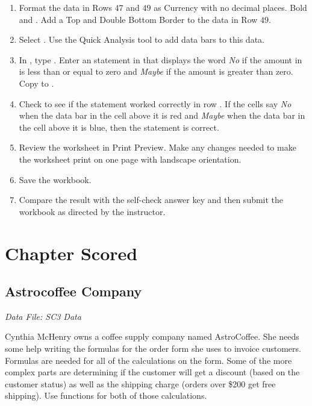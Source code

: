 \begin{enumerate}
	\item Format the data in Rows $ 47 $ and $ 49 $ as Currency with no decimal places. Bold  and . Add a Top and Double Bottom Border to the data in Row $ 49 $.
	\item Select . Use the Quick Analysis tool to add data bars to this data.
	\item In , type . Enter an  statement in  that displays the word \textit{No} if the amount in  is less than or equal to zero and \textit{Maybe} if the amount is greater than zero. Copy  to .
	\item Check to see if the  statement worked correctly in row . If the cells say \textit{No} when the data bar in the cell above it is red and \textit{Maybe} when the data bar in the cell above it is blue, then the  statement is correct.
	\item Review the worksheet in Print Preview. Make any changes needed to make the worksheet print on one page with landscape orientation.
	\item Save the  workbook.
	\item Compare the result with the self-check answer key and then submit the  workbook as directed by the instructor.
\end{enumerate}

\section{Chapter Scored}

\subsection{Astrocoffee Company}

\textit{Data File: SC3 Data}

Cynthia McHenry owns a coffee supply company named AstroCoffee. She needs some help writing the formulas for the order form she uses to invoice customers. Formulas are needed for all of the calculations on the form. Some of the more complex parts are determining if the customer will get a discount (based on the customer status) as well as the shipping charge (orders over \$200 get free shipping). Use  functions for both of those calculations.

